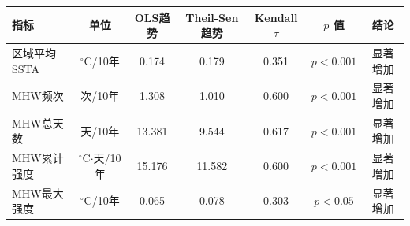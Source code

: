 \begin{tabular}{lcccccc}
\hline
指标 & 单位 & OLS趋势 & Theil-Sen趋势 & Kendall $\tau$ & $p$ 值 & 结论 \\
\hline
区域平均SSTA & $^\circ$C/10年 & 0.174 & 0.179 & 0.351 & $p<0.001$ & 显著增加 \\
MHW频次 & 次/10年 & 1.308 & 1.010 & 0.600 & $p<0.001$ & 显著增加 \\
MHW总天数 & 天/10年 & 13.381 & 9.544 & 0.617 & $p<0.001$ & 显著增加 \\
MHW累计强度 & $^\circ$C$\cdot$天/10年 & 15.176 & 11.582 & 0.600 & $p<0.001$ & 显著增加 \\
MHW最大强度 & $^\circ$C/10年 & 0.065 & 0.078 & 0.303 & $p<0.05$ & 显著增加 \\
\hline
\end{tabular}
